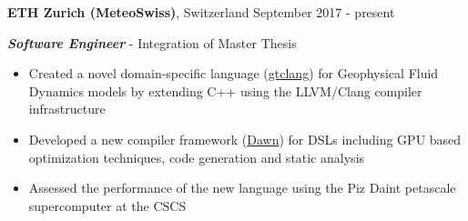 \textbf{ETH Zurich (MeteoSwiss)}, Switzerland  \hfill September 2017 - present

\textbf{\textit{Software Engineer}} - Integration of Master Thesis
\begin{itemize}
    \item Created a novel domain-specific language (\href{https://github.com/MeteoSwiss-APN/gtclang}{gtclang}) for Geophysical Fluid Dynamics models by extending C++ using the LLVM/Clang compiler infrastructure
	\item Developed a new compiler framework (\href{https://github.com/MeteoSwiss-APN/dawn}{Dawn}) for DSLs including GPU based optimization techniques, code generation and static analysis
	\item Assessed the performance of the new language using the Piz Daint petascale supercomputer at the CSCS
\end{itemize}
